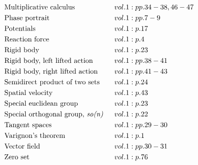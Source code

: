 \documentclass[a4paper]{article}
\begin{document}
\begin{align*}
&\text{Multiplicative calculus} \hspace*{0.55556em}&& vol. 1: pp. 34-38, 46-47\\
&\text{Phase portrait} \hspace*{0.55556em}&& vol. 1: pp. 7-9\\
&\text{Potentials} \hspace*{0.55556em}&& vol. 1: p. 17\\
&\text{Reaction force} \hspace*{0.55556em}&& vol. 1: p. 4\\
&\text{Rigid body} \hspace*{0.55556em}&& vol. 1: p. 23\\
&\text{Rigid body, left lifted action} \hspace*{0.55556em}&& vol. 1: pp. 38-41\\
&\text{Rigid body, right lifted action} \hspace*{0.55556em}&& vol. 1: pp. 41-43\\
&\text{Semidirect product of two sets} \hspace*{0.55556em}&& vol. 1: p. 24\\
&\text{Spatial velocity} \hspace*{0.55556em}&& vol. 1: p. 43\\
&\text{Special euclidean group} \hspace*{0.55556em}&& vol. 1: p. 23\\
&\text{Special orthogonal group, \emph{so(n)}} \hspace*{0.55556em}&& vol. 1: p. 22\\
&\text{Tangent spaces} \hspace*{0.55556em}&& vol. 1: pp. 29-30\\
&\text{Varignon's theorem} \hspace*{0.55556em}&& vol. 1: p. 1\\
&\text{Vector field} \hspace*{0.55556em}&& vol. 1: pp. 30-31\\
&\text{Zero set} \hspace*{0.55556em}&& vol. 1: p. 76\\
\end{align*} 
\end{document}
